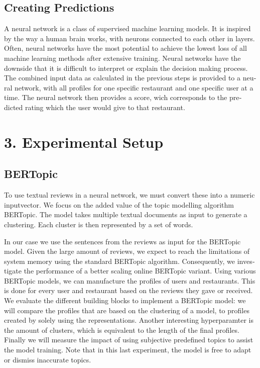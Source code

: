\begin{otherlanguage}{english}
\begin{multicols}{2}
\subsection*{Creating Predictions}
A neural network is a class of supervised machine learning models. It is inspired by the way a human brain works, with neurons connected to each other in layers. Often, neural networks have the most potential to achieve the lowest loss of all machine learning methods after extensive training. \cite{cursus_ML_supervised_eng_summary} Neural networks have the downside that it is difficult to interpret or explain the decision making process.\newline
The combined input data as calculated in the previous steps is provided to a neural network, with all profiles for one specific restaurant and one specific user at a time. The neural network then provides a score, wich corresponds to the predicted rating which the user would give to that restaurant.

\section*{3. Experimental Setup}
\subsection*{BERTopic}
To use textual reviews in a neural network, we must convert these into a numeric inputvector. We focus on the added value of the topic modelling algorithm BERTopic. The model takes multiple textual documents as input to generate a clustering. Each cluster is then represented by a set of words. 

In our case we use the sentences from the reviews as input for the BERTopic model. Given the large amount of reviews, we expect to reach the limitations of system memory using the standard BERTopic algorithm. Consequently, we investigate the performance of a better scaling online BERTopic variant. Using various BERTopic models, we can manufacture the profiles of users and restaurants. This is done for every user and restaurant based on the reviews they gave or received. We evaluate the different building blocks to implement a BERTopic model: we will compare the profiles that are based on the clustering of a model, to profiles created by solely using the representations. Another interesting hyperparamter is the amount of clusters, which is equivalent to the length of the final profiles. Finally we will measure the impact of using subjective predefined topics to assist the model training. Note that in this last experiment, the model is free to adapt or dismiss inaccurate topics.


\end{multicols}
\end{otherlanguage}
